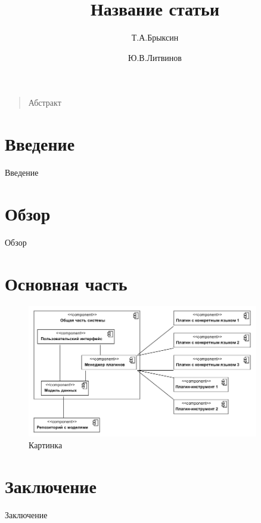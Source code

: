 \documentclass[a4, 12pt]{article}
\title{Название статьи}
\author{Т.А.Брыксин \and Ю.В.Литвинов}
\date{}
\begin{document}
\maketitle
\thispagestyle{empty}

\begin{quote}
\small\noindent
Абстракт
\end{quote}

\section*{Введение}

Введение 

\section{Обзор}

Обзор~\cite{terekhov2009architecture}

\section{Основная часть}

\begin{figure} [ht]
  \begin{center}
    \includegraphics[width=0.9\textwidth]{fig1-architecture-overview.png}
    \caption{Картинка}
    \label{fig1}
  \end{center}
\end{figure}

\section*{Заключение}

Заключение

\nocite{*}


\end{document}
